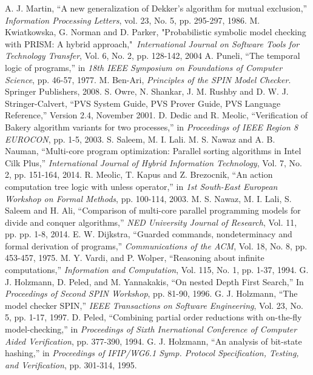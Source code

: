\documentclass[conference]{IEEEtran}
\begin{document}
\begin{thebibliography}{50}
 A. J. Martin, “A new generalization of Dekker's algorithm for mutual exclusion,” \emph{Information Processing Letters}, vol. 23, No. 5, pp. 295-297, 1986. 
 M. Kwiatkowska, G. Norman and D. Parker, "Probabilistic symbolic model checking with PRISM: A hybrid approach," \emph{International Journal on Software Tools for Technology Transfer}, Vol. 6, No. 2, pp. 128-142, 2004
 A. Puneli, “The temporal logic of programs,” in \emph{18th IEEE Symposium on Foundations of Computer Science}, pp. 46-57, 1977. 
 M. Ben-Ari, \emph{Principles of the SPIN Model Checker}. Springer Publishers, 2008.
 S. Owre, N. Shankar, J. M. Rushby and D. W. J. Stringer-Calvert, “PVS System Guide, PVS Prover Guide, PVS Language Reference,” Version 2.4, November 2001.
 D. Dedic and R. Meolic, “Verification of Bakery algorithm variants for two processes,” in \emph{Proceedings of IEEE Region 8 EUROCON}, pp. 1-5, 2003.
 S. Saleem, M. I. Lali. M. S. Nawaz and A. B. Nauman, “Multi-core program optimization: Parallel sorting algorithms in Intel Cilk Plus,” \emph{International Journal of Hybrid Information Technology}, Vol. 7, No. 2, pp. 151-164, 2014.
 R. Meolic, T. Kapus and Z. Brezocnik, “An action computation tree logic with unless operator,” in \emph{1st South-East European Workshop on Formal  Methods}, pp. 100-114, 2003.
 M. S. Nawaz, M. I. Lali, S. Saleem and H. Ali, “Comparison of multi-core parallel programming models for divide and conquer algorithms,” \emph{NED University Journal of Research}, Vol. 11, pp. pp. 1-8, 2014.
 E. W. Dijkstra, “Guarded commands, nondeterminacy and formal derivation of programs,” \emph{Communications of the ACM}, Vol. 18, No. 8, pp. 453-457, 1975.
 M. Y. Vardi, and P. Wolper, “Reasoning about infinite computations,” \emph{Information and Computation}, Vol. 115, No. 1, pp. 1-37, 1994.
 G. J. Holzmann, D. Peled, and M. Yannakakis, “On nested Depth First Search,” In \emph{Proceedings of Second SPIN Workshop}, pp. 81-90, 1996.
 G. J. Holzmann, “The model checker SPIN,” \emph{IEEE Transactions on Software Engineering}, Vol. 23, No. 5, pp. 1-17, 1997.
 D. Peled, “Combining partial order reductions with on-the-fly model-checking,” in \emph{Proceedings of Sixth Inernational Conference of Computer Aided Verification}, pp. 377-390, 1994.
 G. J. Holzmann, “An analysis of bit-state hashing,” in \emph{Proceedings of IFIP/WG6.1 Symp. Protocol Specification, Testing, and Verification}, pp. 301-314, 1995.

\end{thebibliography}
\end{document}
